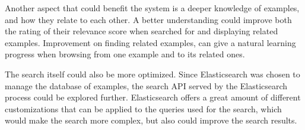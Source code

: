 Another aspect that could benefit the system is a deeper knowledge of examples, and how they relate to each other. A better understanding could improve both the rating of their relevance score when searched for and displaying related examples. Improvement on finding related examples, can give a natural learning progress when browsing from one example and to its related ones.

The search itself could also be more optimized. Since Elasticsearch was chosen to manage the database of examples, the search API served by the Elasticsearch process could be explored further. Elasticsearch offers a great amount of different customizations that can be applied to the queries used for the search, which would make the search more complex, but also could improve the search results. 

\cleardoublepage
